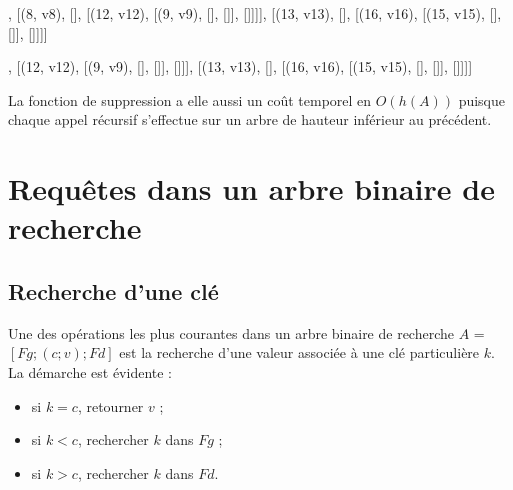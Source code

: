 \documentclass[letterpaper,10pt,english]{jupyterBook}
\begin{document}
\begin{sphinxVerbatimOutput}

\begin{sphinxVerbatim}[commandchars=\\\{\}]
[(12, \PYGZsq{}v12\PYGZsq{}), [(1, \PYGZsq{}v1\PYGZsq{}), [], [(8, \PYGZsq{}v8\PYGZsq{}), [], [(12, \PYGZsq{}v12\PYGZsq{}), [(9, \PYGZsq{}v9\PYGZsq{}), [], []], []]]], [(13, \PYGZsq{}v13\PYGZsq{}), [], [(16, \PYGZsq{}v16\PYGZsq{}), [(15, \PYGZsq{}v15\PYGZsq{}), [], []], []]]]
\end{sphinxVerbatim}
\end{sphinxVerbatimOutput}
\begin{sphinxVerbatimInput}

\begin{sphinxVerbatim}[commandchars=\\\{\}]
\end{sphinxVerbatim}
\end{sphinxVerbatimInput}
\begin{sphinxVerbatimOutput}

\begin{sphinxVerbatim}[commandchars=\\\{\}]
[(12, \PYGZsq{}v12\PYGZsq{}), [(1, \PYGZsq{}v1\PYGZsq{}), [], [(12, \PYGZsq{}v12\PYGZsq{}), [(9, \PYGZsq{}v9\PYGZsq{}), [], []], []]], [(13, \PYGZsq{}v13\PYGZsq{}), [], [(16, \PYGZsq{}v16\PYGZsq{}), [(15, \PYGZsq{}v15\PYGZsq{}), [], []], []]]]
\end{sphinxVerbatim}
\end{sphinxVerbatimOutput}

\sphinxAtStartPar
La fonction de suppression a elle aussi un coût temporel en \(O(h(A))\) puisque chaque appel récursif s’effectue sur un arbre de hauteur inférieur au précédent.


\section{Requêtes dans un arbre binaire de recherche}
\label{\detokenize{notebooks/ABR/ABR:requetes-dans-un-arbre-binaire-de-recherche}}

\subsection{Recherche d’une clé}
\label{\detokenize{notebooks/ABR/ABR:recherche-dune-cle}}
\sphinxAtStartPar
Une des opérations les plus courantes dans un arbre binaire de recherche \(A\) = \([Fg;(c;v);Fd]\) est la recherche
d’une valeur associée à une clé particulière \(k\).
La démarche est évidente :
\begin{itemize}
\item {} 
\sphinxAtStartPar
si \(k = c\), retourner \(v\) ;

\item {} 
\sphinxAtStartPar
si \(k < c\), rechercher \(k\) dans \(Fg\) ;

\item {} 
\sphinxAtStartPar
si \(k > c\), rechercher \(k\) dans \(Fd\).

\end{itemize}
\end{document}
